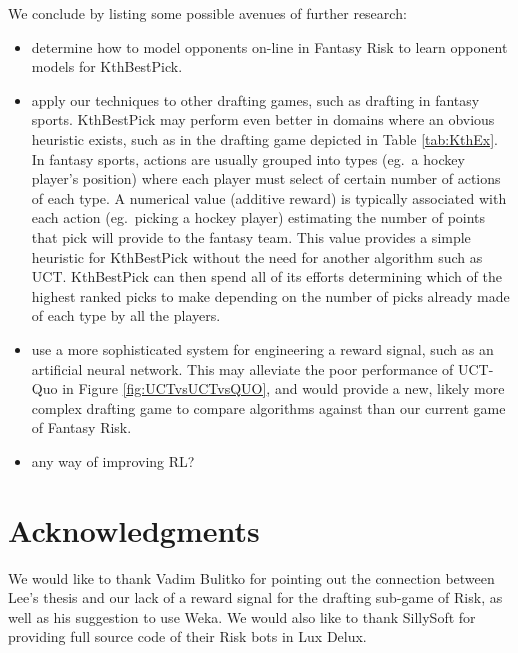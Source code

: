 \documentclass[letterpaper]{article}
\numberwithin{equation}{section}
\numberwithin{theorem}{section}
\numberwithin{lemma}{section}
\numberwithin{df}{section}
\begin{document}
We conclude by listing some possible avenues of further research:
\begin{itemize}
	\item determine how to model opponents on-line in Fantasy Risk to learn opponent models for KthBestPick.
	\item apply our techniques to other drafting games, such as drafting in fantasy sports.  KthBestPick may perform even better in domains where an obvious heuristic exists, such as in the drafting game depicted in Table \ref{tab:KthEx}.  In fantasy sports, actions are usually grouped into types (eg.~a hockey player's position) where each player must select of certain number of actions of each type.  A numerical value (additive reward) is typically associated with each action (eg.~picking a hockey player) estimating the number of points that pick will provide to the fantasy team.  This value provides a simple heuristic for KthBestPick without the need for another algorithm such as UCT.  KthBestPick can then spend all of its efforts determining which of the highest ranked picks to make depending on the number of picks already made of each type by all the players.
	\item use a more sophisticated system for engineering a reward signal, such as an artificial neural network.  This may alleviate the poor performance of UCT-Quo in Figure \ref{fig:UCTvsUCTvsQUO}, and would provide a new, likely more complex drafting game to compare algorithms against than our current game of Fantasy Risk.
	\item any way of improving RL?
\end{itemize}

\section*{Acknowledgments}
We would like to thank Vadim Bulitko for pointing out the connection between Lee's thesis and our lack of a reward signal for the drafting sub-game of Risk, as well as his suggestion to use Weka.  We would also like to thank SillySoft for providing full source code of their Risk bots in Lux Delux.

%
%


\end{document}
